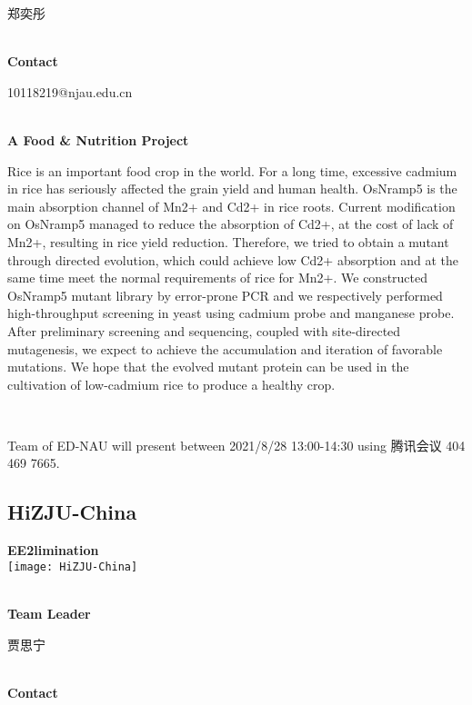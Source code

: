   郑奕彤


\textbf{\\Contact}

  10118219@njau.edu.cn


\textbf{\\A Food & Nutrition Project\\}\begin{spacing}{1.5}

Rice is an important food crop in the world.  For a long time, excessive cadmium in rice has seriously affected the grain yield and human health.  OsNramp5 is the main absorption channel of Mn2+ and Cd2+ in rice roots.  Current modification on OsNramp5 managed to reduce the absorption of Cd2+, at the cost of lack of Mn2+, resulting in rice yield reduction.  Therefore, we tried to obtain a mutant through directed evolution, which could achieve low Cd2+ absorption and at the same time meet the normal requirements of rice for Mn2+.  We constructed OsNramp5 mutant library by error-prone PCR and we respectively performed high-throughput screening in yeast using cadmium probe and manganese probe.  After preliminary screening and sequencing, coupled with site-directed mutagenesis, we expect to achieve the accumulation and iteration of favorable mutations.  We hope that the evolved mutant protein can be used in the cultivation of low-cadmium rice to produce a healthy crop.\end{spacing}
\\

\vfill{}









Team of ED-NAU will present between      2021/8/28 13:00-14:30   using 腾讯会议 404 469 7665.
\newpage


\subsection{\textcolor{Blu}{ HiZJU-China } }
\vspace{5mm}
\begin{center}
\large{
  \textbf{ EE2limination }\\
  \texttt{[image: HiZJU-China]}
}
\end{center}
\textbf{\\Team Leader}

  贾思宁


\textbf{\\Contact}


